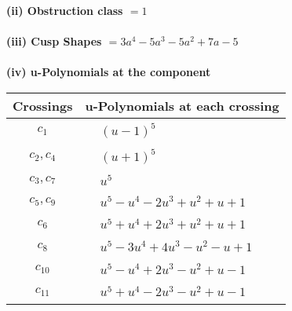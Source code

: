 \documentclass[1p]{elsarticle_modified}
\theoremstyle{definition}
\begin{document}
\flushleft \textbf{(ii) Obstruction class $= 1$}\\~\\
\flushleft \textbf{(iii) Cusp Shapes $= 3 a^4-5 a^3-5 a^2+7 a-5$}\\~\\
\newpage\renewcommand{\arraystretch}{1}
\flushleft \textbf{(iv) u-Polynomials at the component}\newline \\
\begin{tabular}{m{50pt}|m{274pt}}
Crossings & \hspace{64pt}u-Polynomials at each crossing \\
\hline $$\begin{aligned}c_{1}\end{aligned}$$&$\begin{aligned}
&(u-1)^5
\end{aligned}$\\
\hline $$\begin{aligned}c_{2},c_{4}\end{aligned}$$&$\begin{aligned}
&(u+1)^5
\end{aligned}$\\
\hline $$\begin{aligned}c_{3},c_{7}\end{aligned}$$&$\begin{aligned}
&u^5
\end{aligned}$\\
\hline $$\begin{aligned}c_{5},c_{9}\end{aligned}$$&$\begin{aligned}
&u^5- u^4-2 u^3+u^2+u+1
\end{aligned}$\\
\hline $$\begin{aligned}c_{6}\end{aligned}$$&$\begin{aligned}
&u^5+u^4+2 u^3+u^2+u+1
\end{aligned}$\\
\hline $$\begin{aligned}c_{8}\end{aligned}$$&$\begin{aligned}
&u^5-3 u^4+4 u^3- u^2- u+1
\end{aligned}$\\
\hline $$\begin{aligned}c_{10}\end{aligned}$$&$\begin{aligned}
&u^5- u^4+2 u^3- u^2+u-1
\end{aligned}$\\
\hline $$\begin{aligned}c_{11}\end{aligned}$$&$\begin{aligned}
&u^5+u^4-2 u^3- u^2+u-1
\end{aligned}$\\
\hline
\end{tabular}\\~\\
\end{document}
